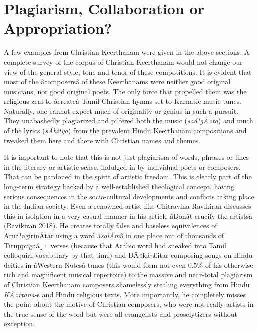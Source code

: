 \section*{Plagiarism, Collaboration or Appropriation?}

A few examples from Christian Keerthanam were given in the above sections. A complete survey of the corpus of Christian Keerthanam would not change our view of the general style, tone and tenor of these compositions. It is evident that most of the âcomposersâ of these Keerthanams were neither good original musicians, nor good original poets. The only force that propelled them was the religious zeal to âcreateâ Tamil Christian hymns set to Karnatic music tunes. Naturally, one cannot expect much of originality or genius in such a pursuit. They unabashedly plagiarized and pilfered both the music (\textit{saá¹gÄ«ta}) and much of the lyrics (\textit{sÄhitya}) from the prevalent Hindu Keerthanam compositions and tweaked them here and there with Christian names and themes.

It is important to note that this is not just plagiarism of words, phrases or lines in the literary or artistic sense, indulged in by individual poets or composers. That can be pardoned in the spirit of artistic freedom. This is clearly part of the long-term strategy backed by a well-established theological concept, having serious consequences in the socio-cultural developments and conflicts taking place in the Indian society. Even a renowned artist like Chitravina Ravikiran discusses this in isolation in a very casual manner in his article âDonât crucify the artistsâ (Ravikiran 2018). He creates totally false and baseless equivalences of Aruá¹agirinÄtar using a word â\textit{salÄm}â in one place out of thousands of Tiruppugaá¸· verses (because that Arabic word had sneaked into Tamil colloquial vocabulary by that time) and DÄ«ká¹£itar composing songs on Hindu deities in âWestern Notesâ tunes (this would form not even 0.5\% of his otherwise rich and magnificent musical repertoire) to the massive and near-total plagiarism of Christian Keerthanam composers shamelessly stealing everything from Hindu \textit{KÄ«rtana}-s and Hindu religious texts. More importantly, he completely misses the point about the motive of Christian composers, who were not really artists in the true sense of the word but were all evangelists and proselytizers without exception.

